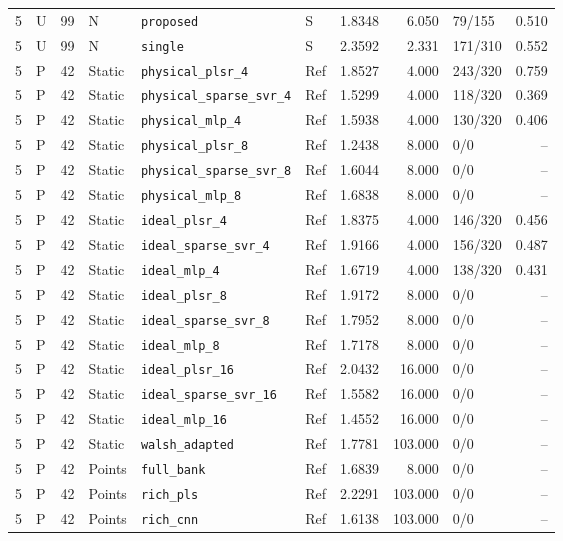 \documentclass[10pt,a4paper]{article}
\begin{document}
\begin{landscape}
\begin{longtable}{rlrlllrrlr}
5 & U & 99 & N & \texttt{proposed} & S & 1.8348 & 6.050 & 79/155 & 0.510 \\
5 & U & 99 & N & \texttt{single} & S & 2.3592 & 2.331 & 171/310 & 0.552 \\
5 & P & 42 & Static & \texttt{physical\_plsr\_4} & Ref & 1.8527 & 4.000 & 243/320 & 0.759 \\
5 & P & 42 & Static & \texttt{physical\_sparse\_svr\_4} & Ref & 1.5299 & 4.000 & 118/320 & 0.369 \\
5 & P & 42 & Static & \texttt{physical\_mlp\_4} & Ref & 1.5938 & 4.000 & 130/320 & 0.406 \\
5 & P & 42 & Static & \texttt{physical\_plsr\_8} & Ref & 1.2438 & 8.000 & 0/0 & -- \\
5 & P & 42 & Static & \texttt{physical\_sparse\_svr\_8} & Ref & 1.6044 & 8.000 & 0/0 & -- \\
5 & P & 42 & Static & \texttt{physical\_mlp\_8} & Ref & 1.6838 & 8.000 & 0/0 & -- \\
5 & P & 42 & Static & \texttt{ideal\_plsr\_4} & Ref & 1.8375 & 4.000 & 146/320 & 0.456 \\
5 & P & 42 & Static & \texttt{ideal\_sparse\_svr\_4} & Ref & 1.9166 & 4.000 & 156/320 & 0.487 \\
5 & P & 42 & Static & \texttt{ideal\_mlp\_4} & Ref & 1.6719 & 4.000 & 138/320 & 0.431 \\
5 & P & 42 & Static & \texttt{ideal\_plsr\_8} & Ref & 1.9172 & 8.000 & 0/0 & -- \\
5 & P & 42 & Static & \texttt{ideal\_sparse\_svr\_8} & Ref & 1.7952 & 8.000 & 0/0 & -- \\
5 & P & 42 & Static & \texttt{ideal\_mlp\_8} & Ref & 1.7178 & 8.000 & 0/0 & -- \\
5 & P & 42 & Static & \texttt{ideal\_plsr\_16} & Ref & 2.0432 & 16.000 & 0/0 & -- \\
5 & P & 42 & Static & \texttt{ideal\_sparse\_svr\_16} & Ref & 1.5582 & 16.000 & 0/0 & -- \\
5 & P & 42 & Static & \texttt{ideal\_mlp\_16} & Ref & 1.4552 & 16.000 & 0/0 & -- \\
5 & P & 42 & Static & \texttt{walsh\_adapted} & Ref & 1.7781 & 103.000 & 0/0 & -- \\
5 & P & 42 & Points & \texttt{full\_bank} & Ref & 1.6839 & 8.000 & 0/0 & -- \\
5 & P & 42 & Points & \texttt{rich\_pls} & Ref & 2.2291 & 103.000 & 0/0 & -- \\
5 & P & 42 & Points & \texttt{rich\_cnn} & Ref & 1.6138 & 103.000 & 0/0 & -- \\

\end{longtable}
\end{landscape}
\end{document}
